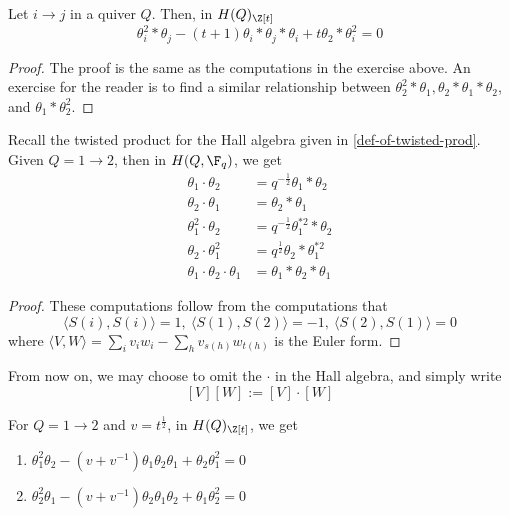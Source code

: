 \documentclass[11pt,leqno,oneside]{amsbook}
\numberwithin{thm}{section}
\renewcommand{\Q}{Q} %
\begin{document}
  \begin{prop}\label{normal-prod-reln}
    Let \(i \to j\) in a quiver \(\Q\). Then, in \(H(\Q)_{\Z[t]}\)\[
      \theta_i^2 * \theta_j - (t+1) \theta_i * \theta_j * \theta_i + t
      \theta_2 * \theta_i^2 = 0
    \]
  \end{prop}
  \begin{proof}
    The proof is the same as the computations in the exercise
    above. An exercise for the reader is to find a similar
    relationship between \(\theta_2^2 * \theta_1, \theta_2 * \theta_1
    * \theta_2\), and \(\theta_1*\theta_2^2\).
  \end{proof}
  \begin{prop}
    Recall the twisted product for the Hall algebra given in
    \ref{def-of-twisted-prod}. Given \(\Q = 1 \to
    2\), then in \(H(\Q,\F_q)\), we get
    \begin{align*}
      \theta_1 \cdot \theta_2 & = q^{-\frac{1}{2}} \theta_1 * \theta_2
      \\
      \theta_2 \cdot \theta_1 & = \theta_2 * \theta_1 \\
      \theta_1^2 \cdot \theta_2 & = q^{-\frac{1}{2}}\theta_1^{*2} * \theta_2 \\
      \theta_2 \cdot \theta_1^2 & = q^{\frac{1}{2}} \theta_2 *
                                  \theta_1^{*2} \\
      \theta_1 \cdot \theta_2 \cdot \theta_1 & = \theta_1 * \theta_2 *
                                               \theta_1 
    \end{align*}
  \end{prop}
  \begin{proof}
    These computations follow from the computations that \[
      \langle S(i), S(i) \rangle = 1, \ \langle S(1), S(2) \rangle =
      -1, \ \langle S(2), S(1) \rangle = 0
    \]
    where \(\langle V,W \rangle = \sum_i v_i w_i - \sum_h v_{s(h)}
    w_{t(h)}\) is the Euler form.
  \end{proof}
  \begin{rmk}
    From now on, we may choose to omit the \(\cdot\) in the Hall
    algebra, and simply write \[
      [V] [W] := [V] \cdot [W]
    \]
  \end{rmk}
  \begin{cor}\label{serre-relns}
    For \(\Q = 1 \to 2\) and \(v = t^{\frac{1}{2}}\), in
    \(H(\Q)_{\Z[t]}\), we get
    \begin{enumerate}
    \item \(\theta_1^2 \theta_2 - (v+v^{-1})\theta_1 \theta_2 \theta_1
      + \theta_2 \theta_1^2 = 0\)
    \item \(\theta_2^2 \theta_1 - (v+v^{-1}) \theta_2 \theta_1
      \theta_2 + \theta_1 \theta_2^2 = 0\)
    \end{enumerate}
  \end{cor}
\end{document}
